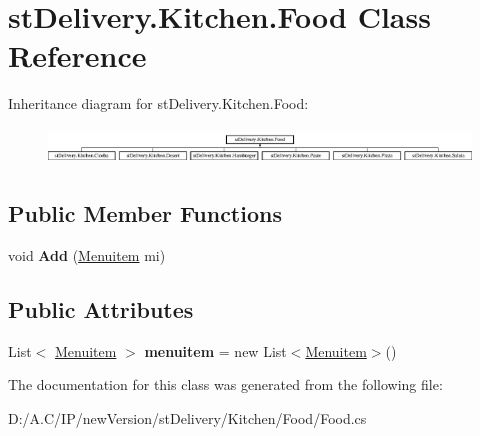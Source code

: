 \hypertarget{classst_delivery_1_1_kitchen_1_1_food}{}\section{st\+Delivery.\+Kitchen.\+Food Class Reference}
\label{classst_delivery_1_1_kitchen_1_1_food}
Inheritance diagram for st\+Delivery.\+Kitchen.\+Food\+:\begin{figure}[H]
\begin{center}
\leavevmode
\includegraphics[height=0.982456cm]{classst_delivery_1_1_kitchen_1_1_food}
\end{center}
\end{figure}
\subsection*{Public Member Functions}
\begin{DoxyCompactItemize}
\item 
\mbox{\label{classst_delivery_1_1_kitchen_1_1_food_a1e718144ec1f452f243dad9ffdae86c9}} 
void {\bfseries Add} (\hyperlink{classst_delivery_1_1_kitchen_1_1_menuitem}{Menuitem} mi)
\end{DoxyCompactItemize}
\subsection*{Public Attributes}
\begin{DoxyCompactItemize}
\item 
\mbox{\label{classst_delivery_1_1_kitchen_1_1_food_a4a2f3029def82daec529700c280a1f7d}} 
List$<$ \hyperlink{classst_delivery_1_1_kitchen_1_1_menuitem}{Menuitem} $>$ {\bfseries menuitem} = new List$<$\hyperlink{classst_delivery_1_1_kitchen_1_1_menuitem}{Menuitem}$>$()
\end{DoxyCompactItemize}


The documentation for this class was generated from the following file\+:\begin{DoxyCompactItemize}
\item 
D\+:/\+A.\+C/\+I\+P/new\+Version/st\+Delivery/\+Kitchen/\+Food/Food.\+cs\end{DoxyCompactItemize}
